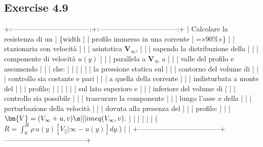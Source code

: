 \documentclass[letterpaper,10pt,italian]{jupyterBook}
\begin{document}
\subsection{Exercise 4.9}
\label{\detokenize{polimi/fluidmechanics-ita/template/capitoli/04_bilanci/0401in:exercise-4-9}}\label{\detokenize{polimi/fluidmechanics-ita/template/capitoli/04_bilanci/0401in:fluid-mechanics-balances-ex-09}}\label{\detokenize{polimi/fluidmechanics-ita/template/capitoli/04_bilanci/0401in::doc}}
\sphinxAtStartPar
+:———————————:+:———————————:+
| Calcolare la resistenza di un     | \{width |
| profilo immerso in una corrente   | =»90\%»\}                           |
| stazionaria con velocità          |                                   |
| asintotica \({\bm{V}}_\infty\),     |                                   |
| sapendo la distribuzione della    |                                   |
| componente di velocità \(u(y)\)     |                                   |
| parallela a \({\bm{V}}_\infty\) a   |                                   |
| valle del profilo e assumendo     |                                   |
| che:                              |                                   |
|                                   |                                   |
| \sphinxhyphen{}   la pressione statica sul      |                                   |
|     contorno del volume di        |                                   |
|     controllo sia costante e pari |                                   |
|     a quella della corrente       |                                   |
|     indisturbata a monte del      |                                   |
|     profilo;                      |                                   |
|                                   |                                   |
| \sphinxhyphen{}   sul lato superiore e          |                                   |
|     inferiore del volume di       |                                   |
|     controllo sia possibile       |                                   |
|     trascurare la componente      |                                   |
|     lungo l’asse \(x\) della        |                                   |
|     perturbazione della velocità  |                                   |
|     dovuta alla presenza del      |                                   |
|     profilo:                      |                                   |
|     \(\bm{V} = (V_{\infty}+u,v) \s |                                   |
| imeq (V_{\infty},v).\)             |                                   |
|                                   |                                   |
| (\(R = \int_0^{ H}\rho \, u(y) [V_ |                                   |
| {\infty}-u(y)] dy.\))              |                                   |
+———————————–+———————————–+
\end{document}
